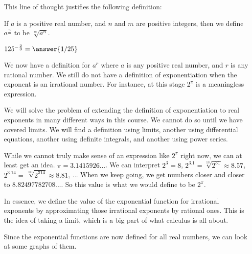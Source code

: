 \documentclass{ximera}
\begin{document}
This line of thought justifies the following definition:

\begin{definition}
If $a$ is a positive real number, and $n$ and $m$ are positive integers, then we define $a^{\frac{n}{m}}$ to be $\sqrt[m]{a^n}$.
\end{definition}

\begin{question}
	 $125^{-\frac{2}{3}} = \answer{1/25}$
\end{question}

We now have a definition for $a^r$ where $a$ is any positive real number, and $r$ is any rational number.  We still do not have a definition of exponentiation when the exponent is an irrational number.  For instance, at this stage $2^\pi$ is a meaningless expression.  

We will solve the problem of extending the definition of exponentiation to real exponents in many different ways in this course.  We cannot do so until we have covered limits.  We will find a definition using limits, another using differential equations,  another using definite integrals, and another using power series.

While we cannot truly make sense of an expression like $2^\pi$ right now, we can at least get an idea.  $\pi = 3.1415926...$.  We can interpret $2^3 = 8 $,  $2^{3.1} = \sqrt[10]{2^{31}} \approx 8.57$, $2^{3.14} = \sqrt[100]{2^{314}} \approx 8.81$, ...
When we keep going, we get numbers closer and closer to $8.82497782708...$.  So this value is what we would define to be $2^\pi$.

In essence, we define the value of the exponential function for irrational exponents by approximating those irrational exponents by rational ones.  This is the idea of taking a limit, which is a big part of what calculus is all about.

Since the exponential functions are now defined for all real numbers, we can look at some graphs of them.
\end{document}

